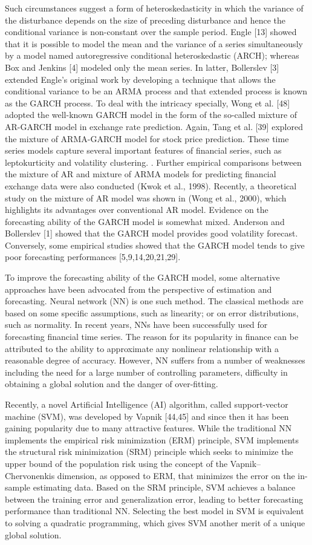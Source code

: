 Such circumstances suggest a form of heteroskedasticity in which the variance of the disturbance depends on the size of preceding disturbance and hence the conditional variance is non-constant over the sample period. Engle [13] showed that it is possible to model the mean and the variance of a series simultaneously by a model named autoregressive conditional heteroskedastic (ARCH); whereas Box and Jenkins [4] modeled only the mean series. In latter, Bollerslev [3] extended Engle’s original work by developing a technique that allows the conditional variance to be an ARMA process and that extended process is known as the GARCH process. To deal with the intricacy specially, Wong et al. [48] adopted the well-known GARCH model in the form of the so-called mixture of AR-GARCH model in exchange rate prediction. Again, Tang et al. [39] explored the mixture of ARMA-GARCH model for stock price prediction. These time series models capture several important features of financial series, such as leptokurticity and volatility clustering. . Further empirical comparisons between the mixture of AR and mixture of ARMA models for predicting financial exchange data were also conducted (Kwok et al., 1998). Recently, a theoretical study on the mixture of AR model was shown in (Wong et al., 2000), which highlights its advantages over conventional AR model. Evidence on the forecasting ability of the GARCH model is somewhat mixed. Anderson and Bollerslev [1] showed that the GARCH model provides good volatility forecast. Conversely, some empirical studies showed that the GARCH model tends to give poor forecasting performances [5,9,14,20,21,29]. 

To improve the forecasting ability of the GARCH model, some alternative approaches have been advocated from the perspective of estimation and forecasting. Neural network (NN) is one such method. The classical methods are based on some specific assumptions, such as linearity; or on error distributions, such as normality. In recent years, NNs have been successfully used for forecasting financial time series. The reason for its popularity in finance can be attributed to the ability to approximate any nonlinear relationship with a reasonable degree of accuracy. However, NN suffers from a number of weaknesses including the need for a large number of controlling parameters, difficulty in obtaining a global solution and the danger of over-fitting.

Recently, a novel Artificial Intelligence (AI) algorithm, called support-vector machine (SVM), was developed by Vapnik [44,45] and since then it has been gaining popularity due to many attractive features. While the traditional NN implements the empirical risk minimization (ERM) principle, SVM implements the structural risk minimization (SRM) principle which seeks to minimize the upper bound of the population risk using the concept of the Vapnik–Chervonenkis dimension, as opposed to ERM, that minimizes the error on the in-sample estimating data. Based on the SRM principle, SVM achieves a balance between the training error and generalization error, leading to better forecasting performance than traditional NN. Selecting the best model in SVM is equivalent to solving a quadratic programming, which gives SVM another merit of a unique global solution. 

